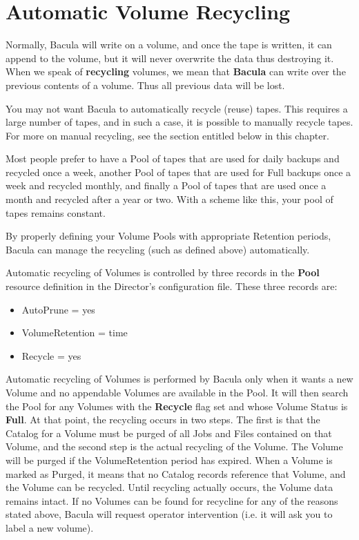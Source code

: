 
\section*{Automatic Volume Recycling}
\label{_ChapterStart22}

Normally, Bacula will write on a volume, and once the tape is written, it can
append to the volume, but it will never overwrite the data thus destroying it.
When we speak of {\bf recycling} volumes, we mean that {\bf Bacula} can write
over the previous contents of a volume. Thus all previous data will be lost. 

You may not want Bacula to automatically recycle (reuse) tapes. This requires
a large number of tapes, and in such a case, it is possible to manually
recycle tapes. For more on manual recycling, see the section entitled 
 below in
this chapter. 

Most people prefer to have a Pool of tapes that are used for daily backups and
recycled once a week, another Pool of tapes that are used for Full backups
once a week and recycled monthly, and finally a Pool of tapes that are used
once a month and recycled after a year or two. With a scheme like this, your
pool of tapes remains constant. 

By properly defining your Volume Pools with appropriate Retention periods,
Bacula can manage the recycling (such as defined above) automatically. 

Automatic recycling of Volumes is controlled by three records in the {\bf
Pool} resource definition in the Director's configuration file. These three
records are: {\bf 

\begin{itemize}
\item AutoPrune = yes 
\item VolumeRetention = \lt{}time\gt{} 
\item Recycle = yes 
   \end{itemize}

} Automatic recycling of Volumes is performed by Bacula only when it wants a
new Volume and no appendable Volumes are available in the Pool. It will then
search the Pool for any Volumes with the {\bf Recycle} flag set and whose
Volume Status is {\bf Full}. At that point, the recycling occurs in two steps.
The first is that the Catalog for a Volume must be purged of all Jobs and
Files contained on that Volume, and the second step is the actual recycling of
the Volume. The Volume will be purged if the VolumeRetention period has
expired. When a Volume is marked as Purged, it means that no Catalog records
reference that Volume, and the Volume can be recycled. Until recycling
actually occurs, the Volume data remains intact. If no Volumes can be found
for recycline for any of the reasons stated above, Bacula will request
operator intervention (i.e. it will ask you to label a new volume). 

